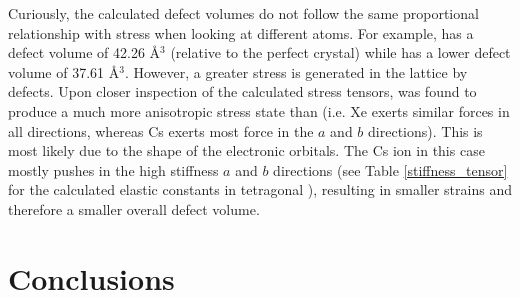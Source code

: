 Curiously, the calculated defect volumes do not follow the same proportional relationship with stress when looking at different atoms. For example,  has a defect volume of 42.26 \r{A}$^{3}$ (relative to the perfect crystal) while  has a lower defect volume of 37.61 \r{A}$^{3}$. However, a greater stress is generated in the lattice by  defects. Upon closer inspection of the calculated stress tensors,  was found to produce a much more anisotropic stress state than  (i.e. Xe exerts similar forces in all directions, whereas Cs exerts most force in the $a$ and $b$ directions). This is most likely due to the shape of the electronic orbitals. The Cs ion in this case mostly pushes in the high stiffness $a$ and $b$ directions (see Table \ref{stiffness_tensor} for the calculated elastic constants in tetragonal \zirconia ), resulting in smaller strains and therefore a smaller overall defect volume.


\section{Conclusions}

